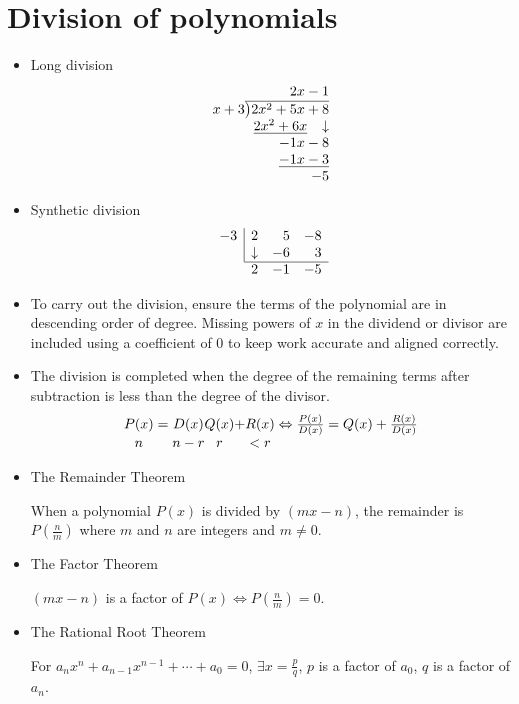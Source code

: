 \section{Division of polynomials}
\begin{itemize}
    \item Long division
        \[
            \begin{array}{r}
                2x-1 \\
                x+3\overline{\smash{\big)}2x^2+5x+8} \\
                \underline{2x^2+6x}\mathbin{\phantom{+}}\downarrow \\
                -1x-8 \\
                \underline{-1x-3} \\
                -5
            \end{array}
        \]
    \item Synthetic division
        \[
            \begin{array}{rrrr}
                \multicolumn{1}{r|}{-3} & 2 & 5 & -8 \\
                \multicolumn{1}{r|}{} & \downarrow & -6 & 3 \\ \cline{2-4}
                & 2 & -1 & -5
            \end{array}
        \]
    \item To carry out the division, ensure the terms of the polynomial are in descending order of degree. Missing powers of $x$ in the dividend or divisor are included using a coefficient of 0 to keep work accurate and aligned correctly.
    \item The division is completed when the degree of the remaining terms after subtraction is less than the degree of the divisor.
        \[
            \begin{array}{c@{}c@{}c@{}c@{}c@{}c@{}c}
            P(x) & {}={} & D(x) & Q(x) & + & R(x) & {}\Leftrightarrow \frac{P(x)}{D(x)}=Q(x)+\frac{R(x)}{D(x)} \\
            n & & n-r & r & & <r &
            \end{array}
        \]
    \item The Remainder Theorem

        When a polynomial $P(x)$ is divided by $(mx-n)$, the remainder is $P(\frac{n}{m})$ where $m$ and $n$ are integers and $m\neq 0$.
    \item The Factor Theorem
        
        $(mx-n)$ is a factor of $P(x)\iff P(\frac{n}{m})=0$.
    \item The Rational Root Theorem

        For $a_n x^n+a_{n-1}x^{n-1}+\cdots+a_0=0$, $\exists x=\frac{p}{q}$, $p$ is a factor of $a_0$, $q$ is a factor of $a_n$.
\end{itemize}

